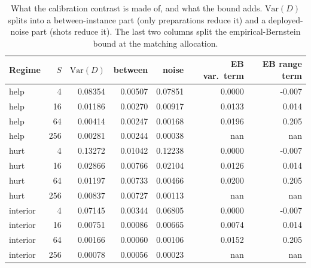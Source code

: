 \begin{table}[h]\centering\small
\begin{tabular}{lrrrrrr}
\toprule
Regime & $S$ & $\mathrm{Var}(D)$ & between & noise & EB var.\ term & EB range term \\
\midrule
help & 4 & 0.08354 & 0.00507 & 0.07851 & 0.0000 & -0.007 \\
help & 16 & 0.01186 & 0.00270 & 0.00917 & 0.0133 & 0.014 \\
help & 64 & 0.00414 & 0.00247 & 0.00168 & 0.0196 & 0.205 \\
help & 256 & 0.00281 & 0.00244 & 0.00038 & nan & nan \\
hurt & 4 & 0.13272 & 0.01042 & 0.12238 & 0.0000 & -0.007 \\
hurt & 16 & 0.02866 & 0.00766 & 0.02104 & 0.0126 & 0.014 \\
hurt & 64 & 0.01197 & 0.00733 & 0.00466 & 0.0200 & 0.205 \\
hurt & 256 & 0.00837 & 0.00727 & 0.00113 & nan & nan \\
interior & 4 & 0.07145 & 0.00344 & 0.06805 & 0.0000 & -0.007 \\
interior & 16 & 0.00751 & 0.00086 & 0.00665 & 0.0074 & 0.014 \\
interior & 64 & 0.00166 & 0.00060 & 0.00106 & 0.0152 & 0.205 \\
interior & 256 & 0.00078 & 0.00056 & 0.00023 & nan & nan \\
\bottomrule\end{tabular}
\caption{What the calibration contrast is made of, and what the bound adds. $\mathrm{Var}(D)$ splits into a between-instance part (only preparations reduce it) and a deployed-noise part (shots reduce it). The last two columns split the empirical-Bernstein bound at the matching allocation.}
\label{tab:variance}
\end{table}
